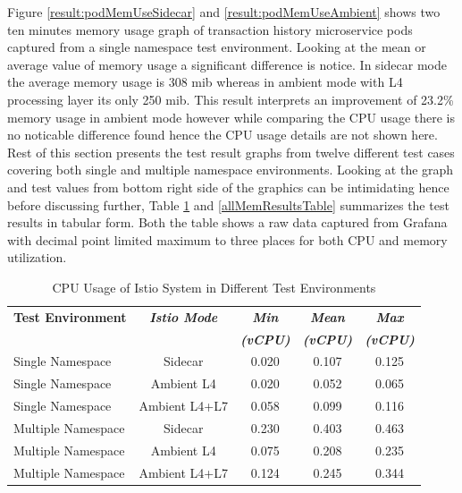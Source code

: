 Figure \ref{result:podMemUseSidecar} and \ref{result:podMemUseAmbient} shows two ten minutes memory usage graph of transaction history microservice pods captured from a single namespace test environment. Looking at the mean or average value of memory usage a significant difference is notice. In sidecar mode the average memory usage is 308 \gls{mib} whereas in ambient mode with L4 processing layer its only 250 \gls{mib}. This result interprets an improvement of 23.2\% memory usage in ambient mode however while comparing the CPU usage there is no noticable difference found hence the CPU usage details are not shown here. Rest of this section presents the test result graphs from twelve different test cases covering both single and multiple namespace environments. Looking at the graph and test values from bottom right side of the graphics can be intimidating hence before discussing further, Table \ref{allCpuResultsTable} and \ref{allMemResultsTable} summarizes the test results in tabular form. Both the table shows a raw data captured from Grafana with decimal point limited maximum to three places for both CPU and memory utilization.

\begin{table}[ht!]
  \centering
  \begin{tabular}{ |l|c|c|c|c|}
    \hline
    \textbf{Test Environment} & \textbf{\textit{Istio Mode}} & \textbf{\textit{Min}} & \textbf{\textit{Mean}} & \textbf{\textit{Max}} \\
    \textbf{\textit{ }} & \textbf{\textit{ }} & \textbf{\textit{(vCPU)}} & \textbf{\textit{(vCPU)}} & \textbf{\textit{(vCPU)}} \\ \hline
    Single Namespace & Sidecar & 0.020 & 0.107 & 0.125 \\ \hline
    Single Namespace & Ambient L4 & 0.020 & 0.052 & 0.065 \\ \hline
    Single Namespace & Ambient L4+L7 & 0.058 & 0.099 & 0.116 \\ \hline

    Multiple Namespace & Sidecar & 0.230 & 0.403 & 0.463 \\ \hline
    Multiple Namespace & Ambient L4 & 0.075 & 0.208 & 0.235 \\ \hline
    Multiple Namespace & Ambient L4+L7 & 0.124 & 0.245 & 0.344 \\ \hline
  \end{tabular}
  \caption{CPU Usage of Istio System in Different Test Environments}
  \label{allCpuResultsTable}
\end{table}

